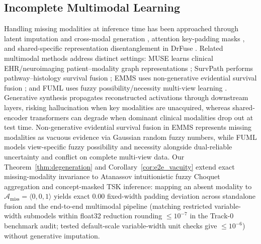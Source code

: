 \documentclass[10pt,twocolumn]{article}
\begin{document}
\subsection{Incomplete Multimodal Learning}
Handling missing modalities at inference time has been approached through latent imputation and
cross-modal generation \cite{ma2021smil}, attention key-padding masks
\cite{vaswani2017attention,shaik2024survey}, and shared-specific representation
disentanglement in DrFuse \cite{yao2024drfuse}. Related multimodal methods address distinct
settings: MUSE learns clinical EHR/neuroimaging patient--modality graph representations
\cite{wu2024muse}; SurvPath performs pathway--histology survival fusion
\cite{jaume2024survpath}; EMMS uses non-generative evidential survival fusion
\cite{xing2026emms}; and FUML uses fuzzy possibility/necessity multi-view learning
\cite{duan2025fuml}. Generative synthesis \cite{ma2021smil} propagates reconstructed
activations through downstream layers, risking hallucination when key modalities are
unacquired, whereas shared-encoder transformers \cite{vaswani2017attention,yao2024drfuse} can
degrade when dominant clinical modalities drop out at test time. Non-generative evidential
survival fusion in EMMS \cite{xing2026emms} represents missing modalities as vacuous evidence
via Gaussian random fuzzy numbers, while FUML \cite{duan2025fuml} models view-specific fuzzy
possibility and necessity alongside dual-reliable uncertainty and conflict on complete
multi-view data.
Our Theorem~\ref{thm:degeneration} and Corollary~\ref{cor:e2e_vacuity} extend exact
missing-modality invariance to Atanassov intuitionistic fuzzy Choquet aggregation and
concept-masked TSK inference: mapping an absent modality to $\mathcal{A}_{\text{miss}} =
\langle 0, 0, 1\rangle$ yields exact $0.00$ fixed-width padding deviation across standalone
fusion and the end-to-end multimodal pipeline (matching restricted variable-width submodels
within float32 reduction rounding $\le 10^{-7}$ in the Track-0 benchmark audit; tested
default-scale variable-width unit checks give $\le 10^{-6}$) without generative imputation.
\end{document}
